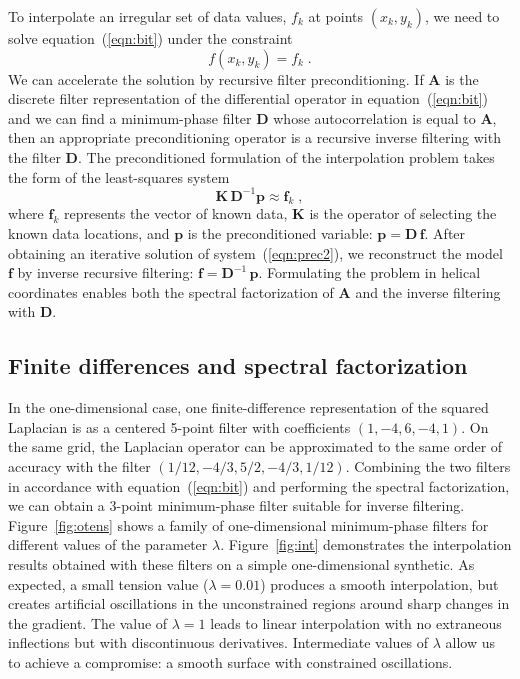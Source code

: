 To interpolate an irregular set of data values, $f_k$ at points
$(x_k,y_k)$, we need to solve equation~(\ref{eqn:bit}) under the
constraint
\begin{equation}
  \label{fk}
  f(x_k,y_k) = f_k\;.
\end{equation}
We can accelerate the solution by recursive filter preconditioning. If
$\mathbf{A}$ is the discrete filter representation of the differential
operator in equation~(\ref{eqn:bit}) and we can find a minimum-phase
filter $\mathbf{D}$ whose autocorrelation is equal to $\mathbf{A}$, then
an appropriate preconditioning operator is a recursive inverse
filtering with the filter $\mathbf{D}$. The preconditioned formulation
of the interpolation problem takes the form of the least-squares system 
\cite[]{iee}
\begin{equation}
\mathbf{K}\, \mathbf{D}^{-1} \mathbf{p} \approx  \mathbf{f}_k\;,
\label{eqn:prec2}
\end{equation}
where $\mathbf{f}_k$ represents the vector of known data, $\mathbf{K}$ is
the operator of selecting the known data locations, and $\mathbf{p}$ is
the preconditioned variable: $\mathbf{p} = \mathbf{D\, f}$. After
obtaining an iterative solution of system~(\ref{eqn:prec2}), we
reconstruct the model $\mathbf{f}$ by inverse recursive filtering:
$\mathbf{f} = \mathbf{D}^{-1}\,\mathbf{p}$. Formulating the problem in
helical coordinates \cite[]{helix0,GEO63-05-15321541} enables both the spectral
factorization of $\mathbf{A}$ and the inverse filtering with $\mathbf{D}$.

\subsection{Finite differences and spectral factorization}


In the one-dimensional case, one finite-difference representation of
the squared Laplacian is as a centered 5-point filter with
coefficients $(1,-4,6,-4,1)$. On the same grid, the Laplacian operator
can be approximated to the same order of accuracy with the filter
$(1/12,-4/3,5/2,-4/3,1/12)$.  Combining the two filters in accordance
with equation~(\ref{eqn:bit}) and performing the spectral
factorization, we can obtain a 3-point minimum-phase filter suitable
for inverse filtering.  Figure~\ref{fig:otens} shows a family of
one-dimensional minimum-phase filters for different values of the
parameter $\lambda$.  Figure~\ref{fig:int} demonstrates the
interpolation results obtained with these filters on a simple
one-dimensional synthetic. As expected, a small tension value
($\lambda=0.01$) produces a smooth interpolation, but creates
artificial oscillations in the unconstrained regions around sharp
changes in the gradient. The value of $\lambda=1$ leads to linear
interpolation with no extraneous inflections but with discontinuous
derivatives. Intermediate values of $\lambda$ allow us to achieve a
compromise: a smooth surface with constrained oscillations.

